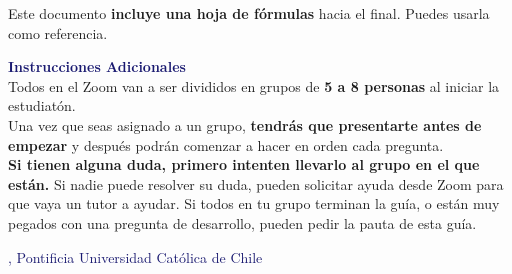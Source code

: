 \begin{coverpages}
\begin{flushleft}
{{            }
        }{}
        {Este documento \textbf{incluye una hoja de fórmulas} hacia el final. Puedes usarla como referencia.\\} %

        \vfill
        \vfill

        \textcolor{MidnightBlue}{\textbf{\large Instrucciones Adicionales}}\\

        Todos en el Zoom van a ser divididos en grupos de \textbf{5 a 8 personas} al iniciar la estudiatón.\\ Una vez que seas asignado a un grupo, \textbf{tendrás que presentarte antes de empezar} y después podrán comenzar a hacer en orden cada pregunta.\\[\baselineskip]

        \textbf{Si tienen alguna duda, primero intenten llevarlo al grupo en el que están.} Si nadie puede resolver su duda, pueden solicitar ayuda desde Zoom para que vaya un tutor a ayudar. Si todos en tu grupo terminan la guía, o están muy pegados con una pregunta de desarrollo, pueden pedir la pauta de esta guía.

        \vspace{8mm} \textcolor{MidnightBlue}{\small \unidadAcademica,  Pontificia Universidad Católica de Chile}
    \end{flushleft}
\end{coverpages}
\newpage

{\printanswers}{}